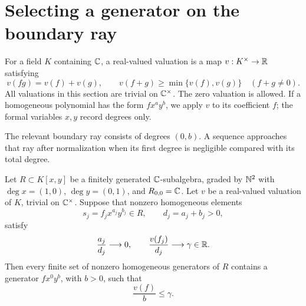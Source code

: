 \section{Selecting a generator on the boundary ray}
\label{sec:generator}

For a field \(K\) containing \(\mathbb C\), a real-valued valuation is a map
\(v:K^\times\to\mathbb R\) satisfying
\[
v(fg)=v(f)+v(g),\qquad
v(f+g)\geq\min\{v(f),v(g)\}\quad(f+g\ne0).
\]
All valuations in this section are trivial on \(\mathbb C^\times\). The zero
valuation is allowed. If a homogeneous polynomial has the form
\(f x^a y^b\), we apply \(v\) to its coefficient \(f\); the formal
variables \(x,y\) record degrees only.

The relevant boundary ray consists of degrees \((0,b)\). A sequence
approaches that ray after normalization when its first degree is
negligible compared with its total degree.

\begin{lemma}
\label{lem:endpoint}
Let \(R\subset K[x,y]\) be a finitely generated \(\mathbb C\)-subalgebra,
graded by \(\mathbb N^2\) with \(\deg x=(1,0)\), \(\deg y=(0,1)\), and
\(R_{0,0}=\mathbb C\). Let \(v\) be a real-valued valuation of \(K\), trivial
on \(\mathbb C^\times\). Suppose that nonzero homogeneous elements
\[
s_j=f_jx^{a_j}y^{b_j}\in R,\qquad d_j=a_j+b_j>0,
\]
satisfy
\[
\frac{a_j}{d_j}\longrightarrow0,
\qquad
\frac{v(f_j)}{d_j}\longrightarrow\gamma\in\mathbb R.
\]
Then every finite set of nonzero homogeneous generators of \(R\)
contains a generator \(f x^0y^b\), with \(b>0\), such that
\[
\frac{v(f)}b\leq\gamma.
\]
\end{lemma}

